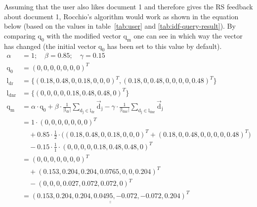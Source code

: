 \noindent
Assuming that the user also likes document 1 and therefore gives the RS feedback about document 1, Rocchio's algorithm would work as shown in the equation below (based on the values in table~\ref{tab:user} and \ref{tab:idf-query-result}).
By comparing $\text{q}_0$ with the modified vector $\text{q}_\text{m}$ one can see in which way the vector has changed (the initial vector $\text{q}_0$ has been set to this value by default).
\begin{align*}
    \alpha &= 1;\quad \beta = 0.85;\quad \gamma = 0.15\\
    \text{q}_0 &= (0, 0, 0, 0, 0, 0, 0)^T \\
    \text{l}_\text{dr} &= \{(0.18, 0.48, 0, 0.18, 0, 0, 0)^T, (0.18, 0, 0.48, 0, 0, 0, 0, 0.48)^T\}\\
    \text{l}_\text{dnr} &= \{(0, 0, 0, 0, 0.18, 0.48, 0.48, 0)^T\}\\
    \text{q}_\text{m} &=
        \alpha \cdot \text{q}_0
        + \beta \cdot \frac{1}{|\text{l}_\text{dr}|}\sum_{\text{d}_\text{j}\in\text{l}_\text{dr}}\vec{\text{d}}_\text{j}
        - \gamma \cdot \frac{1}{|\text{l}_\text{dnr}|}\sum_{\text{d}_\text{j}\in\text{l}_\text{dnr}}\vec{\text{d}}_\text{j}\\
    &= 1 \cdot (0, 0, 0, 0, 0, 0, 0)^T\\
        &\quad+ 0.85 \cdot \frac{1}{2} \cdot \big((0.18, 0.48, 0, 0.18, 0, 0, 0)^T+(0.18, 0, 0.48, 0, 0, 0, 0, 0.48)^T \big)\\
        &\quad- 0.15 \cdot \frac{1}{1} \cdot(0, 0, 0, 0, 0.18, 0.48, 0.48, 0)^T\\
    &= (0, 0, 0, 0, 0, 0, 0)^T\\
        &\quad+(0.153, 0.204, 0.204, 0.0765, 0, 0, 0.204)^T\\
        &\quad-(0, 0, 0, 0.027, 0.072, 0.072, 0)^T\\
    &= \underline{\underline{
            (0.153, 0.204, 0.204, 0.0495, -0.072, -0.072, 0.204)^T
        }}
\end{align*}
